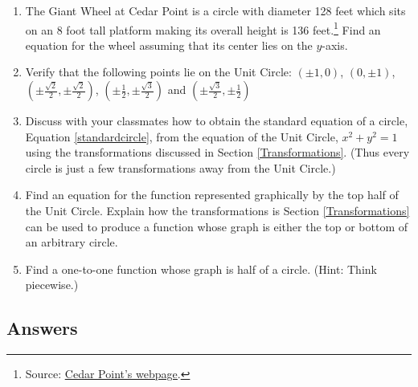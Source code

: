 \begin{enumerate}
\setcounter{enumi}{\value{HW}}

\item The Giant Wheel at Cedar Point is a circle with diameter 128 feet which sits on an 8 foot tall platform making its overall height is 136 feet.\footnote{Source: \href{http://www.cedarpoint.com/public/park/rides/tranquil/giant_wheel.cfm}{\underline{Cedar Point's webpage}}.}  Find an equation for the wheel assuming that its center lies on the $y$-axis.
\label{giantwheelcircle}

\item Verify that the following points lie on the Unit Circle: $(\pm 1, 0)$, $(0, \pm 1)$, $\left(\pm \frac{\sqrt{2}}{2}, \pm \frac{\sqrt{2}}{2}\right)$, $\left(\pm \frac{1}{2}, \pm \frac{\sqrt{3}}{2}\right)$ and  $\left(\pm \frac{\sqrt{3}}{2}, \pm \frac{1}{2}\right)$


\item \label{circletransunitcircleexercise} Discuss with your classmates how to obtain the standard equation of a circle, Equation \ref{standardcircle}, from the equation of the Unit Circle, $x^2+y^2=1$ using the transformations discussed in Section \ref{Transformations}.  (Thus every circle is just a few transformations away from the Unit Circle.)

\item Find an equation for the function represented graphically by the top half of the Unit Circle.  Explain how the transformations is Section \ref{Transformations} can be used to produce a function whose graph is either the top or bottom of an arbitrary circle.

\item Find a one-to-one function whose graph is half of a circle.  (Hint: Think piecewise.)

\end{enumerate}

\newpage

\subsection{Answers}

